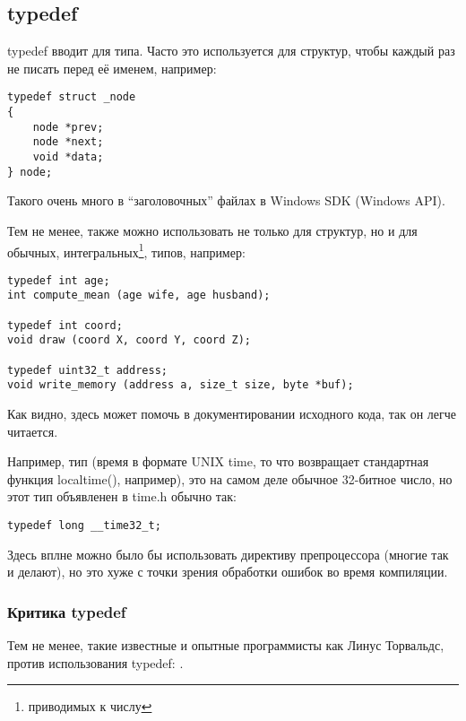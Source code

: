 ﻿\label{typedef}
\subsection{typedef}

typedef вводит  для типа. Часто это используется для структур, чтобы каждый раз не писать 
перед её именем, например:

\begin{lstlisting}
typedef struct _node
{
	node *prev;
	node *next;
	void *data;
} node;
\end{lstlisting}

Такого очень много в ``заголовочных'' файлах в Windows SDK (Windows API).

Тем не менее,  также можно использовать не только для структур, но и для обычных, 
интегральных\footnote{приводимых к числу}, типов, например:

\begin{lstlisting}
typedef int age;
int compute_mean (age wife, age husband);

typedef int coord;
void draw (coord X, coord Y, coord Z);

typedef uint32_t address;
void write_memory (address a, size_t size, byte *buf);
\end{lstlisting}

Как видно,  здесь может помочь в документировании исходного кода, так он легче читается.

Например, тип  (время в формате UNIX time, то что возвращает стандартная функция localtime(), 
например), это на самом деле
обычное 32-битное число, но этот тип объявленен в time.h обычно так:

\begin{lstlisting}
typedef long __time32_t;
\end{lstlisting}

Здесь вплне можно было бы использовать директиву препроцессора  (многие так и делают),
но это хуже с точки зрения обработки ошибок во время компиляции.

\subsubsection{Критика typedef}

Тем не менее, такие известные и опытные программисты как Линус Торвальдс, против использования typedef:
\cite{Torvalds:2002}.


